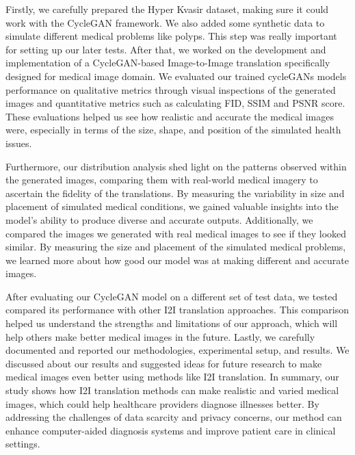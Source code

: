 \documentclass[UKenglish,12pt]{master-style}
\begin{document}
Firstly, we carefully prepared the Hyper Kvasir dataset, making sure it could work with the CycleGAN framework. We also added some synthetic data to simulate different medical problems like polyps. This step was really important for setting up our later tests. After that, we worked on the development and implementation of a CycleGAN-based Image-to-Image translation specifically designed for medical image domain. We evaluated our trained cycleGANs models performance on qualitative metrics through visual inspections of the generated images and quantitative metrics such as calculating FID, SSIM and PSNR score. These evaluations helped us see how realistic and accurate the medical images were, especially in terms of the size, shape, and position of the simulated health issues.

Furthermore, our distribution analysis shed light on the patterns observed within the generated images, comparing them with real-world medical imagery to ascertain the fidelity of the translations. By measuring the variability in size and placement of simulated medical conditions, we gained valuable insights into the model's ability to produce diverse and accurate outputs. Additionally, we compared the images we generated with real medical images to see if they looked similar. By measuring the size and placement of the simulated medical problems, we learned more about how good our model was at making different and accurate images.

After evaluating our CycleGAN model on a different set of test data, we tested compared its performance with other I2I translation approaches. This comparison helped us understand the strengths and limitations of our approach, which will help others make better medical images in the future. Lastly, we carefully documented and reported our methodologies, experimental setup, and results. We discussed about our results and suggested ideas for future research to make medical images even better using methods like I2I translation. In summary, our study shows how I2I translation methods can make realistic and varied medical images, which could help healthcare providers diagnose illnesses better. By addressing the challenges of data scarcity and privacy concerns, our method can enhance computer-aided diagnosis systems and improve patient care in clinical settings.

\backmatter
\printbibliography
\end{document}
